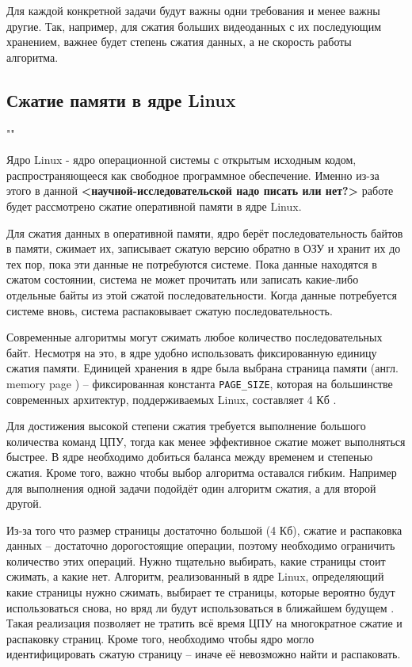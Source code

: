 Для каждой конкретной задачи будут важны одни требования и менее важны другие. Так, например, для сжатия больших видеоданных с их последующим хранением, важнее будет степень сжатия данных, а не скорость работы алгоритма.\\

\subsection{Сжатие памяти в ядре Linux}""\

Ядро Linux \cite{linux} - ядро операционной системы с открытым исходным кодом, распространяющееся как свободное программное обеспечение. Именно из-за этого в данной \textbf{<научной-исследовательской надо писать или нет?>} работе будет рассмотрено сжатие оперативной памяти в ядре Linux.

Для сжатия данных в оперативной памяти, ядро берёт последовательность байтов в памяти, сжимает их, записывает сжатую версию обратно в ОЗУ и хранит их до тех пор, пока эти данные не потребуются системе. Пока данные находятся в сжатом состоянии, система не может прочитать или записать какие-либо отдельные байты из этой сжатой последовательности. Когда данные потребуется системе вновь, система распаковывает сжатую последовательность.

Современные алгоритмы могут сжимать любое количество последовательных байт. Несмотря на это, в ядре удобно использовать фиксированную единицу сжатия памяти. Единицей хранения в ядре была выбрана страница памяти (англ. memory page \cite{memory-page}) -- фиксированная константа \texttt{PAGE\_SIZE}, которая на большинстве современных архитектур, поддерживаемых Linux, составляет 4 Кб \cite{4kb-page-size}.

Для достижения высокой степени сжатия требуется выполнение большого количества команд ЦПУ, тогда как менее эффективное сжатие может выполняться быстрее. В ядре необходимо добиться баланса между временем и степенью сжатия. Кроме того, важно чтобы выбор алгоритма оставался гибким. Например для выполнения одной задачи подойдёт один алгоритм сжатия, а для второй другой.

Из-за того что размер страницы достаточно большой (4 Кб), сжатие и распаковка данных -- достаточно дорогостоящие операции, поэтому необходимо ограничить количество этих операций. Нужно тщательно выбирать, какие страницы стоит сжимать, а какие нет. Алгоритм, реализованный в ядре Linux, определяющий какие страницы нужно сжимать, выбирает те страницы, которые вероятно будут использоваться снова, но вряд ли будут использоваться в ближайшем будущем \cite{in-kernel-memory-compression}. Такая реализация позволяет не тратить всё время ЦПУ на многократное сжатие и распаковку страниц. Кроме того, необходимо чтобы ядро могло идентифицировать сжатую страницу -- иначе её невозможно найти и распаковать.

